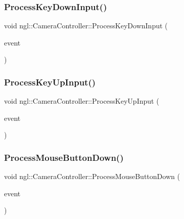 \subsubsection{\texorpdfstring{Process\+Key\+Down\+Input()}{ProcessKeyDownInput()}}
{\footnotesize\ttfamily void ngl\+::\+Camera\+Controller\+::\+Process\+Key\+Down\+Input (\begin{DoxyParamCaption}\item[{const \mbox{\hyperlink{structngl_1_1_key_event}{Key\+Event}} \&}]{event }\end{DoxyParamCaption})\hspace{0.3cm}{\ttfamily [protected]}}

\mbox{\label{classngl_1_1_camera_controller_abc7edc589cc85b663e07eedcc8fc7f80}} 
\subsubsection{\texorpdfstring{Process\+Key\+Up\+Input()}{ProcessKeyUpInput()}}
{\footnotesize\ttfamily void ngl\+::\+Camera\+Controller\+::\+Process\+Key\+Up\+Input (\begin{DoxyParamCaption}\item[{const \mbox{\hyperlink{structngl_1_1_key_event}{Key\+Event}} \&}]{event }\end{DoxyParamCaption})\hspace{0.3cm}{\ttfamily [protected]}}

\mbox{\label{classngl_1_1_camera_controller_a01877cc1edc8f75b65f9b5e7ed6c4d97}} 
\subsubsection{\texorpdfstring{Process\+Mouse\+Button\+Down()}{ProcessMouseButtonDown()}}
{\footnotesize\ttfamily void ngl\+::\+Camera\+Controller\+::\+Process\+Mouse\+Button\+Down (\begin{DoxyParamCaption}\item[{const \mbox{\hyperlink{structngl_1_1_mouse_button_event}{Mouse\+Button\+Event}} \&}]{event }\end{DoxyParamCaption})\hspace{0.3cm}{\ttfamily [protected]}}


